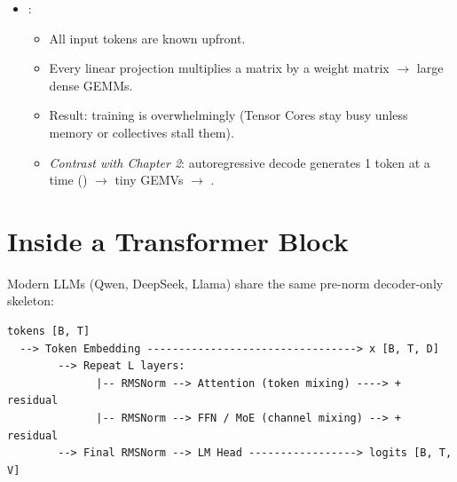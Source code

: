 \begin{itemize}
\begin{enumerate}
    \end{enumerate}
    \item {}:
    \begin{itemize}
        \item All  input tokens are known upfront.
        \item Every linear projection multiplies a \shape{[B*T, D\_in]} matrix by a \shape{[D\_in, D\_out]} weight matrix $\rightarrow$ large dense GEMMs.
        \item Result: training is overwhelmingly  (Tensor Cores stay busy unless memory or collectives stall them).
        \item \emph{Contrast with Chapter 2}: autoregressive decode generates 1 token at a time () $\rightarrow$ tiny GEMVs $\rightarrow$ .
    \end{itemize}
\end{itemize}

\section{Inside a Transformer Block}

\noindent\begin{minipage}{\linewidth}
Modern LLMs (Qwen, DeepSeek, Llama) share the same pre-norm decoder-only skeleton:
\begin{lstlisting}
tokens [B, T]
  --> Token Embedding ---------------------------------> x [B, T, D]
        --> Repeat L layers:
              |-- RMSNorm --> Attention (token mixing) ----> + residual
              |-- RMSNorm --> FFN / MoE (channel mixing) --> + residual
        --> Final RMSNorm --> LM Head -----------------> logits [B, T, V]
\end{lstlisting}
\end{minipage}

